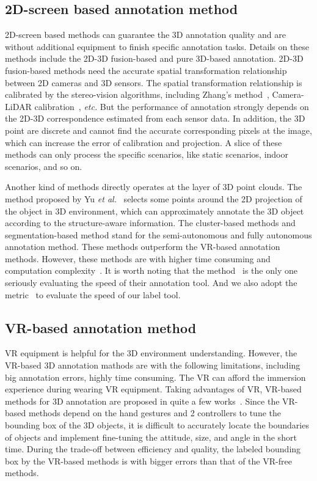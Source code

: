 \documentclass[letterpaper, 10 pt, conference]{ieeeconf}  %
\begin{document}
\subsection{2D-screen based annotation method}
2D-screen based methods can guarantee the 3D annotation quality and are without additional equipment to finish specific annotation tasks.
Details on these methods include the 2D-3D fusion-based and pure 3D-based annotation.
2D-3D fusion-based methods need the accurate spatial transformation relationship between 2D cameras and 3D sensors.
The spatial transformation relationship is calibrated by the stereo-vision algorithms, including Zhang's method~\cite{zhangzhegnyou}, Camera-LiDAR calibration~\cite{roadCalibration}, \emph{etc.}
But the performance of annotation strongly depends on the 2D-3D correspondence estimated from each sensor data. In addition, the 3D point are discrete and cannot find the accurate corresponding pixels at the image, which can increase the error of calibration and projection. A slice of these methods can only process the specific scenarios, like static scenarios, indoor scenarios, and so on.

Another kind of methods directly operates at the layer of 3D point clouds.
The method proposed by Yu \textit{et al.}~\cite{yu2012efficient} selects some points around the 2D projection of the object in 3D environment, which can approximately annotate the 3D object according to the structure-aware information. The cluster-based methods and segmentation-based method stand for the semi-autonomous and fully autonomous annotation method.
These methods outperform the VR-based annotation methods. However, these methods are with higher time consuming and computation complexity~\cite{pointatme}. It is worth noting that the method~\cite{monica2017multi} is the only one seriously evaluating the speed of their annotation tool. And we also adopt the metric~\cite{monica2017multi} to evaluate the speed of our label tool.
\subsection{VR-based annotation method}
VR equipment is helpful for the 3D environment understanding. However, the VR-based 3D annotation mathods are with the following limitations, including big annotation errors, highly time consuming. The VR can afford the immersion experience during wearing VR equipment. Taking advantages of VR, VR-based methods for 3D annotation are proposed in quite a few works~\cite{pointatme,wilkes20123dVR,coffey2011interactiveVR}. Since the VR-based methods depend on the hand gestures and 2 controllers to tune the bounding box of the 3D objects, it is difficult to accurately locate the boundaries of objects and implement fine-tuning the attitude, size, and angle in the short time. During the trade-off between efficiency and quality, the labeled bounding box by the VR-based methods is with bigger errors than that of the VR-free methods.
\end{document}
